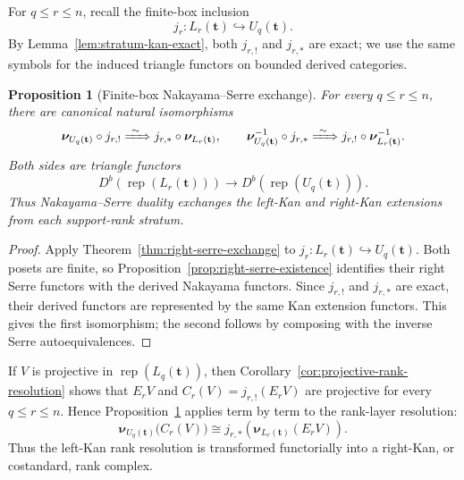 \documentclass[12pt,reqno]{amsart}
\newtheorem{proposition}[theorem]{Proposition}
\theoremstyle{definition}
\theoremstyle{remark}
\newcommand{\Rep}{\operatorname{rep}}
\begin{document}
For $q\le r\le n$, recall the finite-box inclusion
\[
j_r:L_r(\mathbf t)\hookrightarrow U_q(\mathbf t).
\]
By Lemma~\ref{lem:stratum-kan-exact}, both $j_{r,!}$ and $j_{r,*}$ are exact;
we use the same symbols for the induced triangle functors on bounded derived
categories.

\begin{proposition}[Finite-box Nakayama--Serre exchange]\label{prop:nakayama-kan-exchange}
For every $q\le r\le n$, there are canonical natural isomorphisms
\begin{equation}\label{eq:nakayama-kan-exchange}
\boldsymbol\nu_{U_q(\mathbf t)}\circ j_{r,!}
\xRightarrow{\ \sim\ }
j_{r,*}\circ\boldsymbol\nu_{L_r(\mathbf t)},
\qquad
\boldsymbol\nu_{U_q(\mathbf t)}^{-1}\circ j_{r,*}
\xRightarrow{\ \sim\ }
j_{r,!}\circ\boldsymbol\nu_{L_r(\mathbf t)}^{-1}.
\end{equation}
Both sides are triangle functors
\[
D^b\!\left(\Rep(L_r(\mathbf t))\right)
\longrightarrow
D^b\!\left(\Rep(U_q(\mathbf t))\right).
\]
Thus Nakayama--Serre duality exchanges the left-Kan and right-Kan extensions
from each support-rank stratum.
\end{proposition}

\begin{proof}
Apply Theorem~\ref{thm:right-serre-exchange} to
$j_r:L_r(\mathbf t)\hookrightarrow U_q(\mathbf t)$.  Both posets are finite,
so Proposition~\ref{prop:right-serre-existence} identifies their right Serre
functors with the derived Nakayama functors.  Since $j_{r,!}$ and $j_{r,*}$
are exact, their derived functors are represented by the same Kan extension
functors.  This gives the first isomorphism; the second follows by composing
with the inverse Serre autoequivalences.
\end{proof}

If $V$ is projective in $\Rep(L_q(\mathbf t))$, then Corollary~\ref{cor:projective-rank-resolution}
shows that $E_rV$ and $C_r(V)=j_{r,!}(E_rV)$ are projective for every
$q\le r\le n$.  Hence Proposition~\ref{prop:nakayama-kan-exchange} applies
term by term to the rank-layer resolution:
\[
\boldsymbol\nu_{U_q(\mathbf t)}\bigl(C_r(V)\bigr)
\cong
j_{r,*}\!\left(\boldsymbol\nu_{L_r(\mathbf t)}(E_rV)\right).
\]
Thus the left-Kan rank resolution is transformed functorially into a
right-Kan, or costandard, rank complex.
\end{document}
